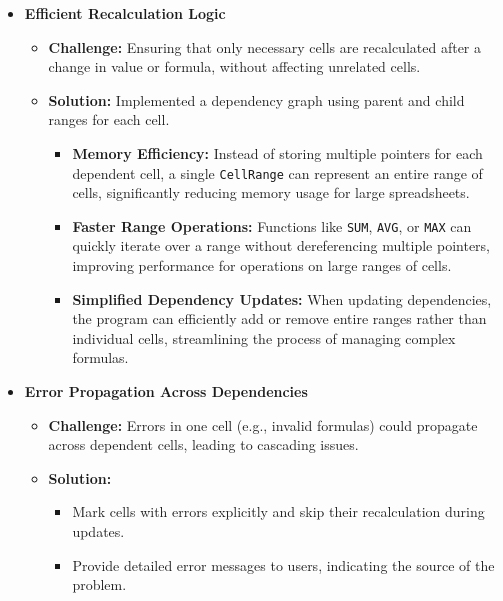 \documentclass{article}
\begin{document}
\begin{itemize}
    \item \textbf{Efficient Recalculation Logic}
    \begin{itemize}
        \item \textbf{Challenge:} Ensuring that only necessary cells are recalculated after a change in value or formula, without affecting unrelated cells.
        \item \textbf{Solution:}
        Implemented a dependency graph using parent and child ranges for each cell.
        \begin{itemize}
            \item \textbf{Memory Efficiency:} Instead of storing multiple pointers for each dependent cell, a single \texttt{CellRange} can represent an entire range of cells, significantly reducing memory usage for large spreadsheets.
            \item \textbf{Faster Range Operations:} Functions like \texttt{SUM}, \texttt{AVG}, or \texttt{MAX} can quickly iterate over a range without dereferencing multiple pointers, improving performance for operations on large ranges of cells.
            \item \textbf{Simplified Dependency Updates:} When updating dependencies, the program can efficiently add or remove entire ranges rather than individual cells, streamlining the process of managing complex formulas.
        \end{itemize}
    \end{itemize}

    \item \textbf{Error Propagation Across Dependencies}
    \begin{itemize}
        \item \textbf{Challenge:} Errors in one cell (e.g., invalid formulas) could propagate across dependent cells, leading to cascading issues.
        \item \textbf{Solution:}
        \begin{itemize}
            \item Mark cells with errors explicitly and skip their recalculation during updates.
            \item Provide detailed error messages to users, indicating the source of the problem.
        \end{itemize}
    \end{itemize}


\end{itemize}
\end{document}
